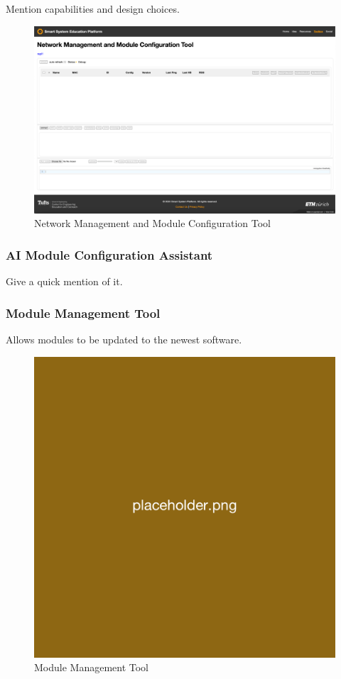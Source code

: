 Mention capabilities and design choices. 

\begin{figure}[H]
    \centering
    \includegraphics[width=\linewidth]{overleaf/images/nmmct_raw.png}
    \vspace{\ftspace}
    \caption{Network Management and Module Configuration Tool}
    \vspace{\ftspace}
    \label{fig:nmmct_raw}
\end{figure}

\subsubsection{\label{sec:res_ai_config}AI Module Configuration Assistant}

Give a quick mention of it.

\subsubsection{\label{sec:res_mmt}Module Management Tool}

Allows modules to be updated to the newest software. 

\begin{figure}[H]
    \centering
    \includegraphics[width=0.5\linewidth]{overleaf/images/placeholder.png}
    \vspace{\ftspace}
    \caption{Module Management Tool}
    \vspace{\ftspace}
    \label{fig:mmt}
\end{figure}

